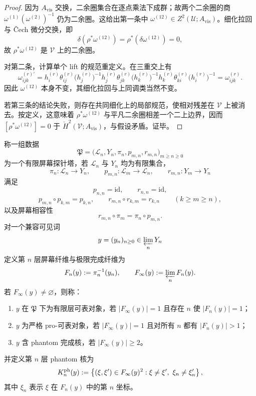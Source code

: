 \begin{proof}
因为 \(A_{\mathrm{vis}}\) 交换，二余圈集合在逐点乘法下成群；故两个二余圈的商
\(
\omega^{(1)}(\omega^{(2)})^{-1}
\)
仍为二余圈。这给出第一条中 \(\omega^{(12)}\in Z^2(\mathcal U;A_{\mathrm{vis}})\)。细化拉回与 \v{C}ech 微分交换，即
\[
\delta(\rho^\ast\omega^{(12)})=\rho^\ast(\delta\omega^{(12)})=0,
\]
故 \(\rho^\ast\omega^{(12)}\) 是 \(\mathcal V\) 上的二余圈。

对第二条，计算单个 lift 的规范重定义。在三重交上有
\[
\omega^{(r)\prime}_{ijk}
=h_i^{(r)}\theta^{(r)}_{ij}\bigl(h_j^{(r)}\bigr)^{-1}
 h_j^{(r)}\theta^{(r)}_{jk}\bigl(h_k^{(r)}\bigr)^{-1}
 h_k^{(r)}\theta^{(r)}_{ki}\bigl(h_i^{(r)}\bigr)^{-1}
=\omega^{(r)}_{ijk}.
\]
因此 \(\omega^{(12)}\) 本身不变，其细化拉回与上同调类当然不变。

若第三条的结论失败，则存在共同细化上的局部规范，使相对残差在 \(\mathcal V\) 上被消去。按定义，这意味着 \(\rho^\ast\omega^{(12)}\) 与平凡二余圈相差一个二上边界，因而
\([
\rho^\ast\omega^{(12)}
]=0
\)
于 \(\check H^2(\mathcal V;A_{\mathrm{vis}})\)，与假设矛盾。证毕。
\end{proof}

\begin{definition}[有限屏幕探针塔]
\label{def:distill-grothendieck-finite-screen-probe-tower}
称一组数据
\[
\mathfrak P=
\bigl(
\mathcal L_n,Y_n,\pi_n,p_{m,n},r_{m,n}
\bigr)_{m\ge n\ge0}
\]
为一个有限屏幕探针塔，若 \(\mathcal L_n\) 与 \(Y_n\) 均为有限集合，
\[
\pi_n:\mathcal L_n\to Y_n,
\qquad
p_{m,n}:\mathcal L_m\to\mathcal L_n,
\qquad
r_{m,n}:Y_m\to Y_n
\]
满足
\[
p_{n,n}=\mathrm{id},\qquad r_{n,n}=\mathrm{id},
\]
\[
p_{m,n}\circ p_{k,m}=p_{k,n},\qquad
r_{m,n}\circ r_{k,m}=r_{k,n}
\qquad(k\ge m\ge n),
\]
以及屏幕相容性
\[
r_{m,n}\circ\pi_m=\pi_n\circ p_{m,n}.
\]
对一个兼容可见词
\[
y=(y_n)_{n\ge0}\in\varprojlim_n Y_n
\]
定义第 \(n\) 层屏幕纤维与极限完成纤维为
\[
F_n(y):=\pi_n^{-1}(y_n),
\qquad
F_\infty(y):=\varprojlim_n F_n(y).
\]
若 \(F_\infty(y)\ne\varnothing\)，则称：
\begin{enumerate}
  \item \(y\) 在 \(\mathfrak P\) 下为有限层可表对象，若 \(|F_\infty(y)|=1\) 且存在 \(n\) 使 \(|F_n(y)|=1\)；
  \item \(y\) 为严格 pro-可表对象，若 \(|F_\infty(y)|=1\) 且对所有 \(n\) 都有 \(|F_n(y)|>1\)；
  \item \(y\) 含 phantom 完成核，若 \(|F_\infty(y)|\ge2\)。
\end{enumerate}
并定义第 \(n\) 层 phantom 核为
\[
K^{\rm ph}_n(y):=
\left\{(\xi,\xi')\in F_\infty(y)^2:
\xi\ne\xi',\ \xi_n\ne\xi'_n
\right\},
\]
其中 \(\xi_n\) 表示 \(\xi\) 在 \(F_n(y)\) 中的第 \(n\) 坐标。
\end{definition}

